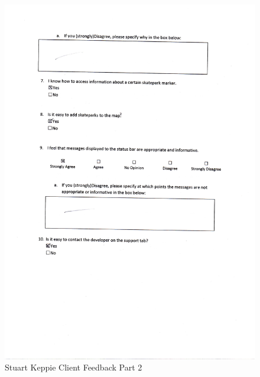 \begin{itemize}
\begin{figure}[H]
    \includegraphics[width=\textwidth]{./Evaluation/images/StuFeedback2.pdf}
    \caption{Stuart Keppie Client Feedback Part 2} \label{fig:StuFeedback2}
\end{figure}


\end{itemize}
